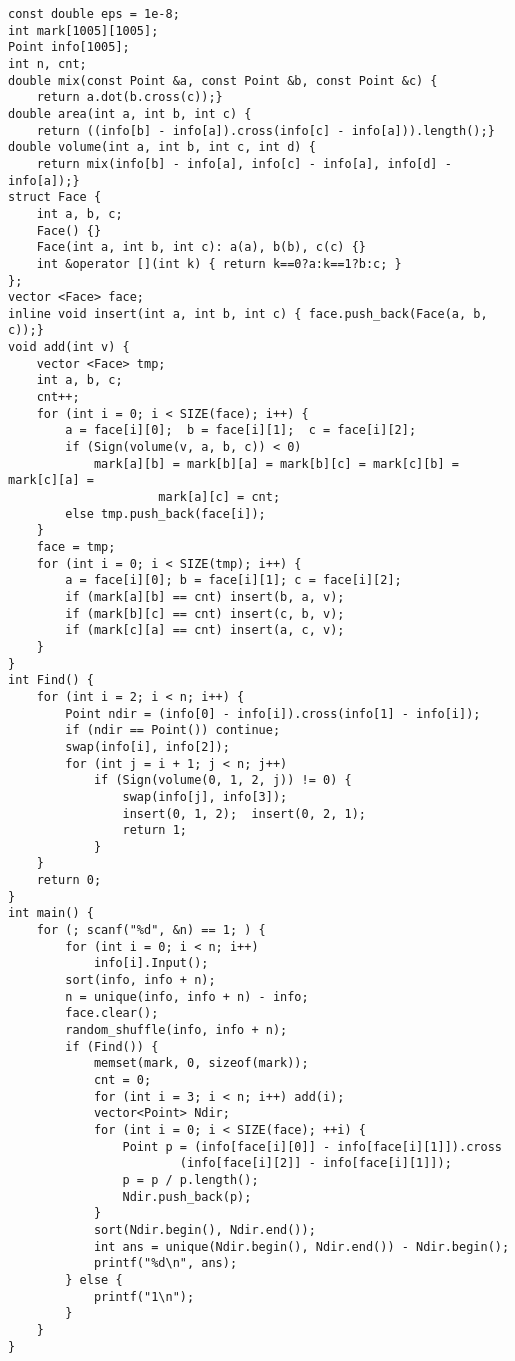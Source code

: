 \begin{lstlisting}
const double eps = 1e-8;
int mark[1005][1005];
Point info[1005];
int n, cnt;
double mix(const Point &a, const Point &b, const Point &c) {
	return a.dot(b.cross(c));}
double area(int a, int b, int c) {
	return ((info[b] - info[a]).cross(info[c] - info[a])).length();}
double volume(int a, int b, int c, int d) {
	return mix(info[b] - info[a], info[c] - info[a], info[d] - info[a]);}
struct Face {
	int a, b, c;
	Face() {}
	Face(int a, int b, int c): a(a), b(b), c(c) {}
	int &operator [](int k) { return k==0?a:k==1?b:c; }
};
vector <Face> face;
inline void insert(int a, int b, int c) { face.push_back(Face(a, b, c));}
void add(int v) {
	vector <Face> tmp;
	int a, b, c;
	cnt++;
	for (int i = 0; i < SIZE(face); i++) {
		a = face[i][0];  b = face[i][1];  c = face[i][2];
		if (Sign(volume(v, a, b, c)) < 0)
			mark[a][b] = mark[b][a] = mark[b][c] = mark[c][b] = mark[c][a] =
					 mark[a][c] = cnt;
		else tmp.push_back(face[i]);
	}
	face = tmp;
	for (int i = 0; i < SIZE(tmp); i++) {
		a = face[i][0]; b = face[i][1]; c = face[i][2];
		if (mark[a][b] == cnt) insert(b, a, v);
		if (mark[b][c] == cnt) insert(c, b, v);
		if (mark[c][a] == cnt) insert(a, c, v);
	}
}
int Find() {
	for (int i = 2; i < n; i++) {
		Point ndir = (info[0] - info[i]).cross(info[1] - info[i]);
		if (ndir == Point()) continue;
		swap(info[i], info[2]);
		for (int j = i + 1; j < n; j++)
			if (Sign(volume(0, 1, 2, j)) != 0) {
				swap(info[j], info[3]);
				insert(0, 1, 2);  insert(0, 2, 1);
				return 1;
			}
	}
	return 0;
}
int main() {
	for (; scanf("%d", &n) == 1; ) {
		for (int i = 0; i < n; i++)
			info[i].Input();
		sort(info, info + n);
		n = unique(info, info + n) - info;
		face.clear();
		random_shuffle(info, info + n);
		if (Find()) {
			memset(mark, 0, sizeof(mark));
			cnt = 0;
			for (int i = 3; i < n; i++) add(i);
			vector<Point> Ndir;
			for (int i = 0; i < SIZE(face); ++i) {
				Point p = (info[face[i][0]] - info[face[i][1]]).cross
						(info[face[i][2]] - info[face[i][1]]);
				p = p / p.length();
				Ndir.push_back(p);
			}
			sort(Ndir.begin(), Ndir.end());
			int ans = unique(Ndir.begin(), Ndir.end()) - Ndir.begin();
			printf("%d\n", ans);
		} else {
			printf("1\n");
		}
	}
}
\end{lstlisting}

